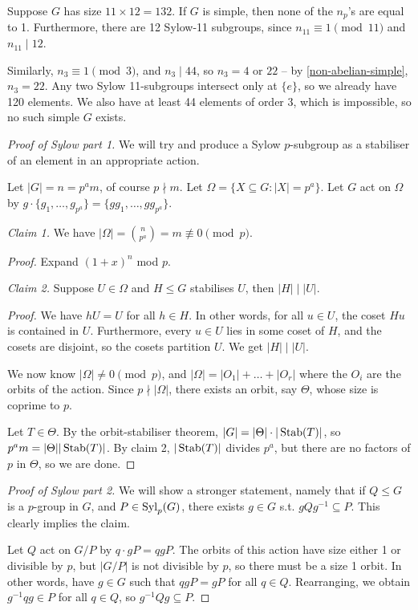 \documentclass{../../template/note}
\begin{document}
    \begin{example*}
        Suppose $G$ has size $11 \times 12 = 132$. If $G$ is simple, then none of the $n_p$'s are equal to 1. Furthermore, there are 12 Sylow-11 subgroups, since $n_11 \equiv 1 \pmod 11$ and $n_11 \mid 12$.

        Similarly, $n_3 \equiv 1 \pmod 3$, and $n_3 \mid 44$, so $n_3 = 4$ or $22$ -- by \cref{non-abelian-simple}, $n_3 = 22$. Any two Sylow 11-subgroups intersect only at $\{e\}$, so we already have 120 elements. We also have at least 44 elements of order 3, which is impossible, so no such simple $G$ exists.
    \end{example*}
    
    \begin{proof}[Proof of Sylow part 1]
        We will try and produce a Sylow $p$-subgroup as a stabiliser of an element in an appropriate action.

        Let $|G| = n = p^am$, of course $p \nmid m$. Let $\Omega = \{X \subseteq G : |X| = p^a\}$. Let $G$ act on $\Omega$ by $g \cdot \{g_1, \dots, g_{p^a}\} = \{gg_1, \dots, gg_{p^a}\}$.

        \emph{Claim 1.} We have $|\Omega| = \binom n {p^a} = m \not\equiv 0\pmod p$.

        \emph{Proof.} Expand $(1+x)^n$ mod $p$.

        \emph{Claim 2.} Suppose $U \in \Omega$ and $H \leq G$ stabilises $U$, then $|H| \mid |U|$.

        \emph{Proof.} We have $hU = U$ for all $h \in H$. In other words, for all $u \in U$, the coset $Hu$ is contained in $U$. Furthermore, every $u \in U$ lies in some coset of $H$, and the cosets are disjoint, so the cosets partition $U$. We get $|H| \mid |U|$.

        We now know $|\Omega| \neq 0 \pmod p$, and $|\Omega| = |O_1| + \dots + |O_r|$ where the $O_i$ are the orbits of the action. Since $p \nmid |\Omega|$, there exists an orbit, say $\Theta$, whose size is coprime to $p$.

        Let $T \in \Theta$. By the orbit-stabiliser theorem, $|G| = |\Theta|\cdot|\operatorname{Stab}(T)|$, so $p^am = |\Theta||\operatorname{Stab}(T)|$. By claim 2, $|\operatorname{Stab}(T)|$ divides $p^a$, but there are no factors of $p$ in $\Theta$, so we are done.
    \end{proof}
    

    \begin{proof}[Proof of Sylow part 2]
        We will show a stronger statement, namely that if $Q \leq G$ is a $p$-group in $G$, and $P \in \operatorname{Syl}_p(G)$, there exists $g \in G$ s.t. $gQg^{-1} \subseteq P$. This clearly implies the claim.

        Let $Q$ act on $G/P$ by $q \cdot gP = qgP$. The orbits of this action have size either 1 or divisible by $p$, but $|G/P|$ is not divisible by $p$, so there must be a size 1 orbit. In other words, have $g \in G$ such that $qgP = gP$ for all $q \in Q$. Rearranging, we obtain $g^{-1}qg \in P$ for all $q \in Q$, so $g^{-1}Qg \subseteq P$.
    \end{proof}
\end{document}
